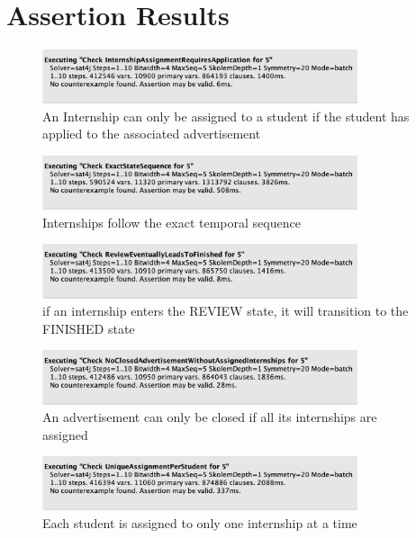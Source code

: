 \section{Assertion Results}

\begin{figure}[H]
    \centering
    \includegraphics[width=350px]{../../assets/alloy-assertion/I_assertion.png}
    \caption{An Internship can only be assigned to a student if the student has applied to the associated advertisement}
\end{figure}

\begin{figure}[H]
    \centering
    \includegraphics[width=350px]{../../assets/alloy-assertion/II_assertion.png}
    \caption{Internships follow the exact temporal sequence}
\end{figure}

\begin{figure}[H]
    \centering
    \includegraphics[width=350px]{../../assets/alloy-assertion/III_assertion.png}
    \caption{if an internship enters the REVIEW state, it will transition to the FINISHED state}
\end{figure}


\begin{figure}[H]
    \centering
    \includegraphics[width=350px]{../../assets/alloy-assertion/IV_assertion.png}
    \caption{An advertisement can only be closed if all its internships are assigned}
\end{figure}

\begin{figure}[H]
    \centering
    \includegraphics[width=350px]{../../assets/alloy-assertion/V_assertion.png}
    \caption{Each student is assigned to only one internship at a time}
\end{figure}



